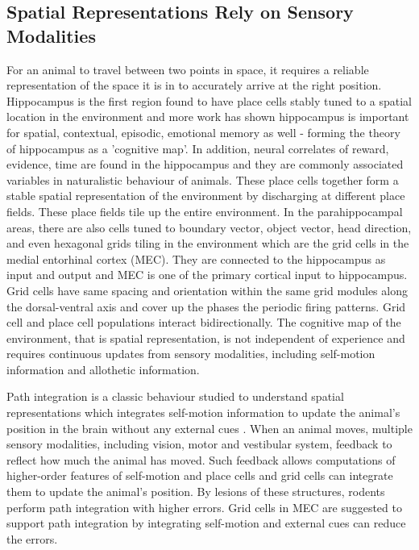 \subsection{Spatial Representations Rely on Sensory Modalities}
For an animal to travel between two points in space, it requires a reliable representation of the space it is in to accurately arrive at the right position. Hippocampus is the first region found to have place cells stably tuned to a spatial location in the environment and more work has shown hippocampus is important for spatial, contextual, episodic, emotional memory as well - forming the theory of hippocampus as a 'cognitive map'. In addition, neural correlates of  reward, evidence, time are found in the hippocampus and they are commonly associated variables in naturalistic behaviour of animals. These place cells together form a stable spatial representation of the environment by discharging at different place fields. These place fields tile up the entire environment. In the parahippocampal areas, there are also cells tuned to boundary vector, object vector, head direction, and even hexagonal grids tiling in the environment which are the grid cells in the medial entorhinal cortex (MEC). They are connected to the hippocampus as input and output and MEC is one of the primary cortical input to hippocampus. Grid cells have same spacing and orientation within the same grid modules along the dorsal-ventral axis and cover up the phases the periodic firing patterns. Grid cell and place cell populations interact bidirectionally. The cognitive map of the environment, that is spatial representation, is not independent of experience and requires continuous updates from sensory modalities, including self-motion information and allothetic information.

Path integration is a classic behaviour studied to understand spatial representations which integrates self-motion information to update the animal's position in the brain without any external cues \cite{mcnaughton_path_2006, etienne_path_2004}. When an animal moves, multiple sensory modalities, including vision, motor and vestibular system, feedback to reflect how much the animal has moved. Such feedback allows computations of higher-order features of self-motion and place cells and grid cells can integrate them to update the animal's position. By lesions of these structures, rodents perform path integration with higher errors. Grid cells in MEC are suggested to support path integration by integrating self-motion and external cues can reduce the errors.

